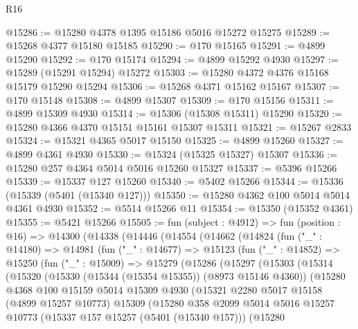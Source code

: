 \begin{lexlean}{R16}
\begin{coremodule}
@15286 := @15280 @4378 @1395 @15186 @5016 @15272 @15275
@15289 := @15268 @4377 @15180 @15185
@15290 := @170 @15165
@15291 := @4899 @15290
@15292 := @170 @15174
@15294 := @4899 @15292 @4930
@15297 := @15289 (@15291 @15294) @15272
@15303 := @15280 @4372 @4376 @15168 @15179 @15290 @15294
@15306 := @15268 @4371 @15162 @15167
@15307 := @170 @15148
@15308 := @4899 @15307
@15309 := @170 @15156
@15311 := @4899 @15309 @4930
@15314 := @15306 (@15308 @15311) @15290
@15320 := @15280 @4366 @4370 @15151 @15161 @15307 @15311
@15321 := @15267 @2833
@15324 := @15321 @4365 @5017 @15150
@15325 := @4899 @15260
@15327 := @4899 @4361 @4930
@15330 := @15324 (@15325 @15327) @15307
@15336 := @15280 @257 @4364 @5014 @5016 @15260 @15327
@15337 := @5396 @15266
@15339 := @15337 @127 @15260
@15340 := @5402 @15266
@15344 := @15336 (@15339 (@5401 (@15340 @127)))
@15350 := @15280 @4362 @100 @5014 @5014 @4361 @4930
@15352 := @5514 @15266 @11
@15354 := @15350 (@15352 @4361)
@15355 := @5421 @15266
@15505 := fun (subject : @4912) =>
  fun (position : @16) =>
  @14300
    (@14338
      (@14446
        (@14554
          (@14662
            (@14824
              (fun ("_" : @14180) =>
              @14981
                (fun ("_" : @14677) =>
                @15123
                  (fun ("_" : @14852) =>
                  @15250
                    (fun ("_" : @15009) =>
                    @15279
                      (@15286
                        (@15297
                          (@15303
                            (@15314
                              (@15320
                                (@15330 (@15344 (@15354 @15355)) (@8973 @15146 @4360))
                                (@15280
                                  @4368
                                  @100
                                  @15159
                                  @5014
                                  @15309
                                  @4930
                                  (@15321
                                    @2280
                                    @5017
                                    @15158
                                    (@4899 @15257 @10773)
                                    @15309
                                    (@15280
                                      @358
                                      @2099
                                      @5014
                                      @5016
                                      @15257
                                      @10773
                                      (@15337 @157 @15257 (@5401 (@15340 @157)))
                                      (@15280

\end{coremodule}
\end{lexlean}
